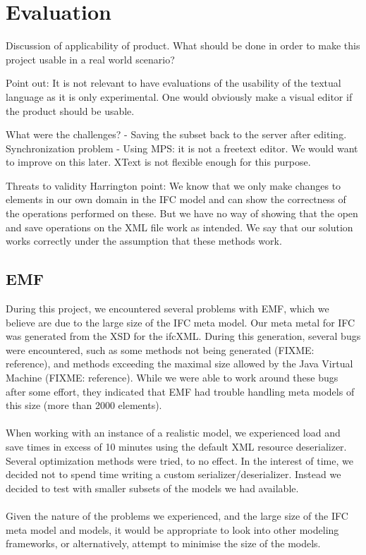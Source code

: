 \section{Evaluation}
Discussion of applicability of product. What should be done in order to make this project usable in a real world scenario?

Point out: It is not relevant to have evaluations of the usability of the textual language as it is only experimental. One would obviously make a visual editor if the product should be usable.

What were the challenges?
- Saving the subset back to the server after editing. Synchronization problem
- Using MPS: it is not a freetext editor. We would want to improve on this later. XText is not flexible enough for this purpose.



Threats to validity
Harrington point: We know that we only make changes to elements in our own domain in the IFC model and can show the correctness of the operations performed on these. But we have no way of showing that the open and save operations on the XML file work as intended. We say that our solution works correctly under the assumption that these methods work.

\subsection{EMF}
\label{Evaluation_EMF}
During this project, we encountered several problems with EMF, which we believe are due to the large size of the IFC meta model. Our meta metal for IFC was generated from the XSD for the ifcXML. During this generation, several bugs were encountered, such as some methods not being generated (FIXME: reference), and methods exceeding the maximal size allowed by the Java Virtual Machine (FIXME: reference). While we were able to work around these bugs after some effort, they indicated that EMF had trouble handling meta models of this size (more than 2000 elements).
\paragraph{}
When working with an instance of a realistic model, we experienced load and save times in excess of 10 minutes using the default XML resource deserializer. Several optimization methods were tried\cite{emfperformancetips, emfperformanceandextensibility}, to no effect. In the interest of time, we decided not to spend time writing a custom serializer/deserializer. Instead we decided to test with smaller subsets of the models we had available.
\paragraph{}
Given the nature of the problems we experienced, and the large size of the IFC meta model and models, it would be appropriate to look into other modeling frameworks, or alternatively, attempt to minimise the size of the models.

